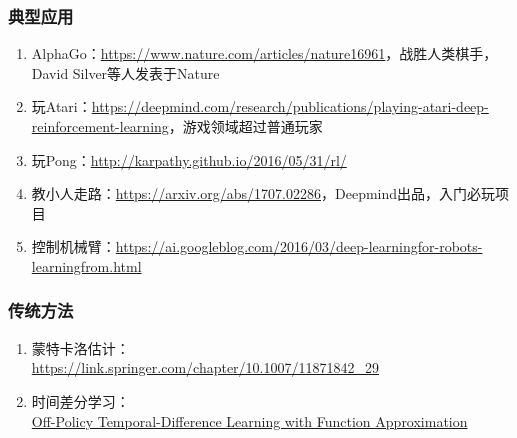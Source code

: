 \documentclass[lang=cn,11pt,a4paper]{elegant_template}
\begin{document}
\subsubsection{典型应用}
\begin{enumerate}
    \item AlphaGo：\href{https://www.nature.com/articles/nature16961}{https://www.nature.com/articles/nature16961}，战胜人类棋手，David Silver等人发表于Nature
    \item 玩Atari：\href{https://deepmind.com/research/publications/playing-atari-deep-reinforcement-learning}{https://deepmind.com/research/publications/playing-atari-deep-reinforcement-learning}，游戏领域超过普通玩家
    \item 玩Pong：\href{http://karpathy.github.io/2016/05/31/rl/}{http://karpathy.github.io/2016/05/31/rl/} 
    \item 教小人走路：\href{https://arxiv.org/abs/1707.02286}{https://arxiv.org/abs/1707.02286}，Deepmind出品，入门必玩项目
    \item 控制机械臂：\href{https://ai.googleblog.com/2016/03/deep-learningfor-robots-learningfrom.html}{https://ai.googleblog.com/2016/03/deep-learningfor-robots-learningfrom.html}
\end{enumerate}

\subsubsection{传统方法}
\begin{enumerate}
    \item 蒙特卡洛估计：\\
    \href{https://link.springer.com/chapter/10.1007/11871842_29}{https://link.springer.com/chapter/10.1007/11871842\_29}
    \item 时间差分学习：\\
    \href{https://www.researchgate.net/publication/2371944_Off-Policy_Temporal-Difference_Learning_with_Function_Approximation}{Off-Policy Temporal-Difference Learning with Function Approximation}
\end{enumerate}
\end{document}
